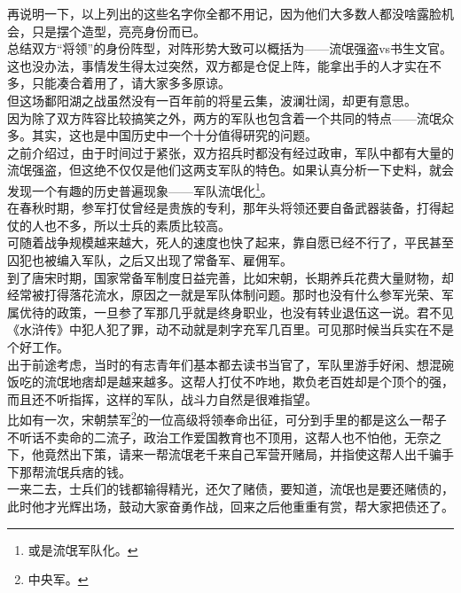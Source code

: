 \begin{multicols}{\theparacolNo}
再说明一下，以上列出的这些名字你全都不用记，因为他们大多数人都没啥露脸机会，只是摆个造型，亮亮身份而已。\\

总结双方“将领”的身份阵型，对阵形势大致可以概括为——流氓强盗vs书生文官。\\

这也没办法，事情发生得太过突然，双方都是仓促上阵，能拿出手的人才实在不多，只能凑合着用了，请大家多多原谅。\\

但这场鄱阳湖之战虽然没有一百年前的将星云集，波澜壮阔，却更有意思。\\

因为除了双方阵容比较搞笑之外，两方的军队也包含着一个共同的特点——流氓众多。其实，这也是中国历史中一个十分值得研究的问题。\\

之前介绍过，由于时间过于紧张，双方招兵时都没有经过政审，军队中都有大量的流氓强盗，但这绝不仅仅是他们这两支军队的特色。如果认真分析一下史料，就会发现一个有趣的历史普遍现象——军队流氓化\footnote{或是流氓军队化。}。\\

在春秋时期，参军打仗曾经是贵族的专利，那年头将领还要自备武器装备，打得起仗的人也不多，所以士兵的素质比较高。\\

可随着战争规模越来越大，死人的速度也快了起来，靠自愿已经不行了，平民甚至囚犯也被编入军队，之后又出现了常备军、雇佣军。\\

到了唐宋时期，国家常备军制度日益完善，比如宋朝，长期养兵花费大量财物，却经常被打得落花流水，原因之一就是军队体制问题。那时也没有什么参军光荣、军属优待的政策，一旦参了军那几乎就是终身职业，也没有转业退伍这一说。君不见《水浒传》中犯人犯了罪，动不动就是刺字充军几百里。可见那时候当兵实在不是个好工作。\\

出于前途考虑，当时的有志青年们基本都去读书当官了，军队里游手好闲、想混碗饭吃的流氓地痞却是越来越多。这帮人打仗不咋地，欺负老百姓却是个顶个的强，而且还不听指挥，这样的军队，战斗力自然是很难指望。\\

比如有一次，宋朝禁军\footnote{中央军。}的一位高级将领奉命出征，可分到手里的都是这么一帮子不听话不卖命的二流子，政治工作爱国教育也不顶用，这帮人也不怕他，无奈之下，他竟然出下策，请来一帮流氓老千来自己军营开赌局，并指使这帮人出千骗手下那帮流氓兵痞的钱。\\

一来二去，士兵们的钱都输得精光，还欠了赌债，要知道，流氓也是要还赌债的，此时他才光辉出场，鼓动大家奋勇作战，回来之后他重重有赏，帮大家把债还了。\\


\end{multicols}
